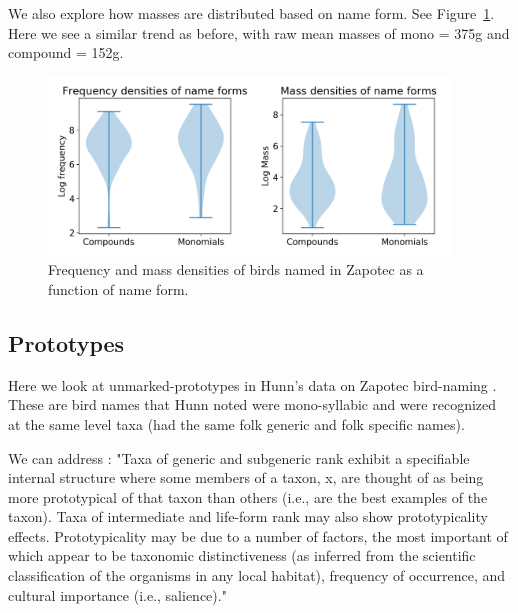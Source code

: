 \documentclass[10pt,letterpaper]{article}
\begin{document}
We also explore how masses are distributed based on name form. See Figure~\ref{fig-both-nameforms}. Here we see a similar trend as before, with raw mean masses of mono = 375g and compound = 152g.


\begin{figure}[ht!]
  \begin{center}
    \includegraphics[width=0.95\textwidth]{./figures/nameforms-both.png}
        \caption{Frequency and mass densities of birds named in Zapotec as a function of name form.}
        \label{fig-both-nameforms}
  \end{center}
\end{figure}

\subsection{Prototypes}

Here we look at unmarked-prototypes in Hunn's data on Zapotec bird-naming  \cite{hunn2008zapotec}. These are bird names that Hunn noted were mono-syllabic and were recognized at the same level taxa (had the same folk generic and folk specific names).


We can address \cite{berlin2014ethnobiological}:
 "Taxa of generic and subgeneric rank exhibit a specifiable internal
structure where some members of a taxon, x, are thought of as being
more prototypical of that taxon than others (i.e., are the best
examples of the taxon). Taxa of intermediate and life-form rank may
also show prototypicality effects. Prototypicality may be due to a
number of factors, the most important of which appear to be taxonomic
distinctiveness (as inferred from the scientific classification of the
organisms in any local habitat), frequency of occurrence, and cultural
importance (i.e., salience)."
\end{document}
